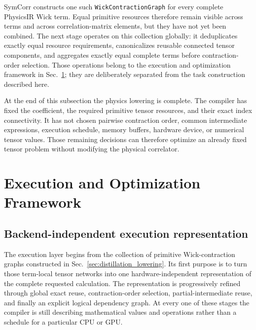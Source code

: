 \documentclass[11pt]{article}
\begin{document}
SymCorr constructs one such \texttt{WickContractionGraph} for every complete
PhysicsIR Wick term. Equal primitive resources therefore remain visible across
terms and across correlation-matrix elements, but they have not yet been
combined. The next stage operates on this collection globally: it deduplicates
exactly equal resource requirements, canonicalizes reusable connected tensor
components, and aggregates exactly equal complete terms before contraction-order
selection. Those operations belong to the execution and optimization framework
in Sec.~\ref{sec:execution}; they are deliberately separated from the task
construction described here.

At the end of this subsection the physics lowering is complete. The compiler has
fixed the coefficient, the required primitive tensor resources, and their exact
index connectivity. It has not chosen pairwise contraction order, common
intermediate expressions, execution schedule, memory buffers, hardware device,
or numerical tensor values. Those remaining decisions can therefore optimize an
already fixed tensor problem without modifying the physical correlator.

\section{Execution and Optimization Framework}
\label{sec:execution}


\subsection{Backend-independent execution representation}

The execution layer begins from the collection of primitive Wick-contraction
graphs constructed in Sec.~\ref{sec:distillation_lowering}. Its first purpose is
to turn those term-local tensor networks into one hardware-independent
representation of the complete requested calculation. The representation is
progressively refined through global exact reuse, contraction-order selection,
partial-intermediate reuse, and finally an explicit logical dependency graph.
At every one of these stages the compiler is still describing mathematical
values and operations rather than a schedule for a particular CPU or GPU.
\end{document}
